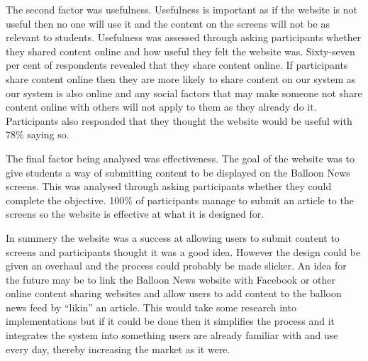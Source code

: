 The second factor was usefulness. Usefulness is important as if the website is not useful then no one will use it and the content on the screens will not be as relevant to students. Usefulness was assessed through asking participants whether they shared content online and how useful they felt the website was. Sixty-seven per cent of respondents revealed that they share content online. If participants share content online then they are more likely to share content on our system as our system is also online and any social factors that may make someone not share content online with others will not apply to them as they already do it. Participants also responded that they thought the website would be useful with 78\% saying so.

The final factor being analysed was effectiveness. The goal of the website was to give students a way of submitting content to be displayed on the Balloon News screens. This was analysed through asking participants whether they could complete the objective. 100\% of participants manage to submit an article to the screens so the website is effective at what it is designed for. 

In summery the website was a success at allowing users to submit content to screens and participants thought it was a good idea. However the design could be given an overhaul and the process could probably be made slicker. An idea for the future may be to link the Balloon News website with Facebook or other online content sharing websites and allow users to add content to the balloon news feed by ``likin'' an article. This would take some research into implementations but if it could be done then it simplifies the process and it integrates the system into something users are already familiar with and use every day, thereby increasing the market as it were. 
